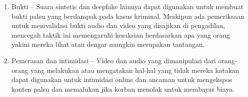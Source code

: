 \begin{enumerate}
\item Bukti – Suara sintetis dan deepfake lainnya dapat digunakan untuk membuat bukti palsu yang berdampak pada kasus kriminal. Meskipun ada pemeriksaan untuk memvalidasi bukti audio dan video yang disajikan di pengadilan, mencegah taktik ini memengaruhi kesaksian berdasarkan apa yang orang yakini mereka lihat atau dengar mungkin merupakan tantangan.

\item Pemerasan dan intimidasi – Video dan audio yang dimanipulasi dari orang-orang yang melakukan atau mengatakan hal-hal yang tidak mereka katakan dapat digunakan untuk intimidasi online dan ancaman untuk mengekspos konten palsu dan memalukan jika korban menolak untuk membayar biaya.

\end{enumerate}

